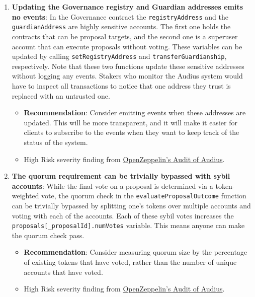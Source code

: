 \begin{enumerate}
\item\textbf{Updating the Governance registry and Guardian addresses emits no events}: In the Governance contract the \verb|registryAddress| and the \verb|guardianAddress| are highly sensitive accounts. The first one holds the contracts that can be proposal targets, and the second one is a superuser account that can execute proposals without voting. These variables can be updated by calling \verb|setRegistryAddress| and \verb|transferGuardianship|, respectively. Note that these two functions update these sensitive addresses without logging any events. Stakers who monitor the Audius system would have to inspect all transactions to notice that one address they trust is replaced with an untrusted one.
	\begin{itemize}
	\item\textbf{Recommendation}: Consider emitting events when these addresses are updated. This will be more transparent, and it will make it easier for clients to subscribe to the events when they want to keep track of the status of the system.
	\item High Risk severity finding from \href{https://blog.openzeppelin.com/audius-contracts-audit/#high}{OpenZeppelin’s Audit of Audius}.
	\end{itemize}

\item\textbf{The quorum requirement can be trivially bypassed with sybil accounts}: While the final vote on a proposal is determined via a token-weighted vote, the quorum check in the \verb|evaluateProposalOutcome| function can be trivially bypassed by splitting one’s tokens over multiple accounts and voting with each of the accounts. Each of these sybil votes increases the \verb|proposals[_proposalId].numVotes| variable. This means anyone can make the quorum check pass.
	\begin{itemize}
	\item\textbf{Recommendation}: Consider measuring quorum size by the percentage of existing tokens that have voted, rather than the number of unique accounts that have voted.
	\item High Risk severity finding from \href{https://blog.openzeppelin.com/audius-contracts-audit/#high}{OpenZeppelin’s Audit of Audius}.
	\end{itemize}


\end{enumerate}
